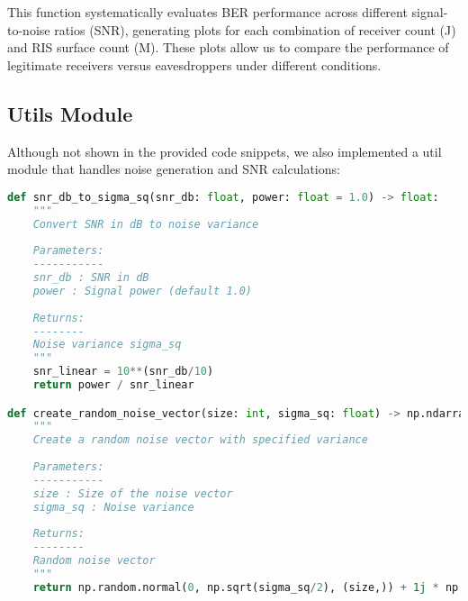 This function systematically evaluates BER performance across different signal-to-noise ratios (SNR), generating plots for each combination of receiver count (J) and RIS surface count (M). These plots allow us to compare the performance of legitimate receivers versus eavesdroppers under different conditions.

\newpage
\subsection{Utils Module}

Although not shown in the provided code snippets, we also implemented a util module that handles noise generation and SNR calculations:

\begin{lstlisting}[language=python, caption={Util Module Functions}]
def snr_db_to_sigma_sq(snr_db: float, power: float = 1.0) -> float:
    """
    Convert SNR in dB to noise variance
    
    Parameters:
    -----------
    snr_db : SNR in dB
    power : Signal power (default 1.0)
    
    Returns:
    --------
    Noise variance sigma_sq
    """
    snr_linear = 10**(snr_db/10)
    return power / snr_linear

def create_random_noise_vector(size: int, sigma_sq: float) -> np.ndarray:
    """
    Create a random noise vector with specified variance
    
    Parameters:
    -----------
    size : Size of the noise vector
    sigma_sq : Noise variance
    
    Returns:
    --------
    Random noise vector
    """
    return np.random.normal(0, np.sqrt(sigma_sq/2), (size,)) + 1j * np.random.normal(0, np.sqrt(sigma_sq/2), (size,))
\end{lstlisting}

